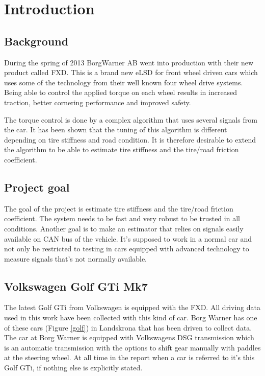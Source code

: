 \chapter{Introduction}

\section{Background}
During the spring of 2013 BorgWarner AB went into production with their new product called FXD. This is a brand new eLSD for front wheel driven cars which uses some of the technology from their well known four wheel drive systems. Being able to control the applied torque on each wheel results in increased traction, better cornering performance and improved safety.

The torque control is done by a complex algorithm that uses several signals from the car. It has been shown that the tuning of this algorithm is different depending on tire stiffness and road condition. It is therefore desirable to extend the algorithm to be able to estimate tire stiffness and the tire/road friction coefficient.

\section{Project goal}
The goal of the project is estimate tire stiffness and the tire/road friction coefficient. The system needs to be fast and very robust to be trusted in all conditions. Another goal is to make an estimator that relies on signals easily available on CAN bus of the vehicle. It's supposed to work in a normal car and not only be restricted to testing in cars equipped with advanced technology to measure signals that's not normally available. 

\section{Volkswagen Golf GTi Mk7}
The latest Golf GTi from Volkswagen is equipped with the FXD. All driving data used in this work have been collected with this kind of car. Borg Warner has one of these cars (Figure \ref{golf}) in Landskrona that has been driven to collect data. The car at Borg Warner is equipped with Volkswagens DSG transmission which is an automatic transmission with the options to shift gear manually with paddles at the steering wheel. At all time in the report when a car is referred to it's this Golf GTi, if nothing else is explicitly stated.


